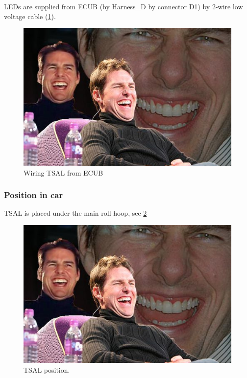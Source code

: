 LEDs are supplied from ECUB (by Harness\_D by connector D1) by 2-wire low voltage cable (\ref{fig:TSAL-wiring}).

\begin{figure}[H]
	\centering
	\includegraphics[width=\textwidth]{./img/tsal-wiring.jpg}
	\caption{Wiring TSAL from ECUB}
	\label{fig:TSAL-wiring}
\end{figure}

\subsubsection{Position in car}
TSAL is placed under the main roll hoop, see \ref{fig:TSAL-position}

\begin{figure}[H]
	\centering
	\includegraphics[width=\textwidth]{./img/tsal-position.jpg}
	\caption{TSAL position.}
	\label{fig:TSAL-position}
\end{figure}